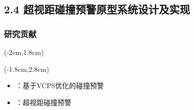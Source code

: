 \subsection[\englishfont 2.4 超视距碰撞预警原型系统设计及实现]{2.4 超视距碰撞预警原型系统设计及实现}

\begin{frame}
\frametitle{\englishfont 研究贡献}
\newBackground
\begin{center}
\begin{textblock*}{\textwidth}(-2cm,1.8cm)
\begin{spacing}{0}
  \small \englishfont \colorbox{cqublue}{}
\end{spacing}
\end{textblock*}
\end{center}

\begin{center}
\begin{textblock*}{\textwidth}(-1.8cm,2.8cm)
\begin{minipage}[t]{0.7\textwidth}
\begin{itemize}[itemsep=0.2\baselineskip] \englishfont 
	\item[\ding{111}] {{}：基于VCPS优化的碰撞预警} 
	\begin{itemize}[itemsep=0.2\baselineskip]
	\end{itemize}
	\item[\ding{111}]  {{}：超视距碰撞预警{\color{red}{原型系统}}}
	\begin{itemize}
	\end{itemize}
\end{itemize}
\end{minipage}
\end{textblock*}
\end{center}


\end{frame}
